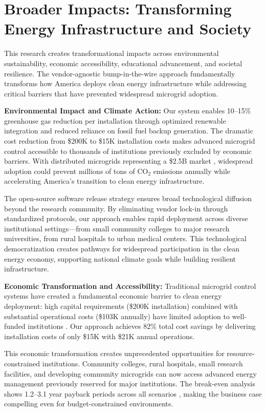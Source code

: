 \documentclass[12pt]{article}
\begin{document}
\section{Broader Impacts: Transforming Energy Infrastructure and Society}

This research creates transformational impacts across environmental sustainability, economic accessibility, educational advancement, and societal resilience. The vendor-agnostic bump-in-the-wire approach fundamentally transforms how America deploys clean energy infrastructure while addressing critical barriers that have prevented widespread microgrid adoption.

\textbf{Environmental Impact and Climate Action:} Our system enables 10--15\% greenhouse gas reduction per installation through optimized renewable integration and reduced reliance on fossil fuel backup generation. The dramatic cost reduction from \$200K to \$15K installation costs \cite{our2024economic} makes advanced microgrid control accessible to thousands of institutions previously excluded by economic barriers. With distributed microgrids representing a \$2.5B market \cite{our2024economic}, widespread adoption could prevent millions of tons of CO$_2$ emissions annually while accelerating America's transition to clean energy infrastructure.

The open-source software release strategy ensures broad technological diffusion beyond the research community. By eliminating vendor lock-in through standardized protocols, our approach enables rapid deployment across diverse institutional settings---from small community colleges to major research universities, from rural hospitals to urban medical centers. This technological democratization creates pathways for widespread participation in the clean energy economy, supporting national climate goals while building resilient infrastructure.

\textbf{Economic Transformation and Accessibility:} Traditional microgrid control systems have created a fundamental economic barrier to clean energy deployment: high capital requirements (\$200K installation) combined with substantial operational costs (\$103K annually) have limited adoption to well-funded institutions \cite{hirsch2018,sigrin2019}. Our approach achieves 82\% total cost savings \cite{our2024economic} by delivering installation costs of only \$15K with \$21K annual operations.

This economic transformation creates unprecedented opportunities for resource-constrained institutions. Community colleges, rural hospitals, small research facilities, and developing community microgrids can now access advanced energy management previously reserved for major institutions. The break-even analysis shows 1.2--3.1 year payback periods across all scenarios \cite{our2024economic}, making the business case compelling even for budget-constrained environments.
\end{document}
